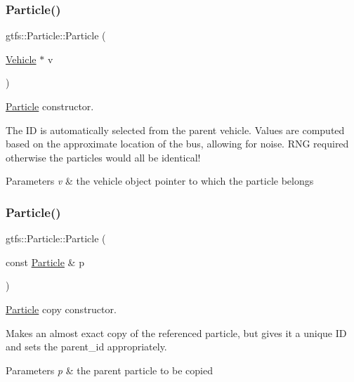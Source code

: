 \subsubsection{\texorpdfstring{Particle()}{Particle()}\hspace{0.1cm}{\footnotesize\ttfamily [1/2]}}
{\footnotesize\ttfamily gtfs\+::\+Particle\+::\+Particle (\begin{DoxyParamCaption}\item[{\hyperlink{classgtfs_1_1Vehicle}{Vehicle} $\ast$}]{v }\end{DoxyParamCaption})}

\hyperlink{classgtfs_1_1Particle}{Particle} constructor.

The ID is automatically selected from the parent vehicle. Values are computed based on the approximate location of the bus, allowing for noise. R\+NG required otherwise the particles would all be identical!


\begin{DoxyParams}{Parameters}
{\em v} & the vehicle object pointer to which the particle belongs \\
\hline
\end{DoxyParams}
\mbox{\label{classgtfs_1_1Particle_ac386e64b43b1e317063f9a6666d604ce}} 
\subsubsection{\texorpdfstring{Particle()}{Particle()}\hspace{0.1cm}{\footnotesize\ttfamily [2/2]}}
{\footnotesize\ttfamily gtfs\+::\+Particle\+::\+Particle (\begin{DoxyParamCaption}\item[{const \hyperlink{classgtfs_1_1Particle}{Particle} \&}]{p }\end{DoxyParamCaption})}

\hyperlink{classgtfs_1_1Particle}{Particle} copy constructor.

Makes an almost exact copy of the referenced particle, but gives it a unique ID and sets the parent\+\_\+id appropriately.


\begin{DoxyParams}{Parameters}
{\em p} & the parent particle to be copied \\
\hline
\end{DoxyParams}
\mbox{\label{classgtfs_1_1Particle_a3accf3496ad8460b4ad8b3f6da2de411}} 
